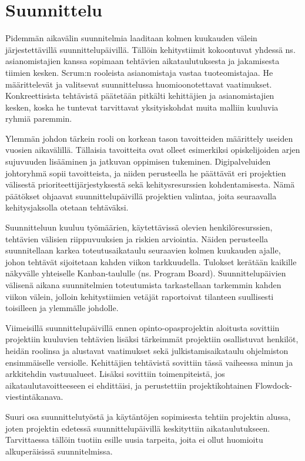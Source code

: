 \documentclass[11pt]{article}
\begin{document}
\section{Suunnittelu}

Pidemmän aikavälin suunnitelmia laaditaan kolmen kuukauden välein
järjestettävillä suun\-nit\-te\-lu\-päivillä. Tällöin kehitystiimit kokoontuvat
yhdessä ns. asianomistajien kanssa sopimaan tehtävien aikataulutuksesta ja
jakamisesta tiimien kesken. Scrum:n rooleista asi\-an\-omistaja vastaa
tuoteomistajaa. He määrittelevät ja valitsevat suunnittelussa huomioon\-otettavat
vaatimukset. Konkreettisista tehtävis\-tä päätetään pit\-käl\-ti
kehittäjien ja asian\-omistajien kes\-ken, koska he tuntevat tarvittavat
yksityis\-koh\-dat muita malliin kuuluvia ryhmiä paremmin.

Ylemmän johdon tärkein rooli on korkean tason tavoitteiden määrittely useiden
vuosien aikavälillä. Tällaisia tavoitteita ovat olleet esimerkiksi
opiskelijoiden arjen sujuvuuden lisää\-minen ja jatkuvan oppimisen tukeminen.
Digipalveluiden johtoryhmä sopii tavoitteista, ja niiden perusteella he
päättävät eri projektien välisestä prioriteetti\-jär\-jes\-tyksestä sekä
kehitysresurssien kohdentamisesta. Nämä päätökset ohjaavat suunnittelupäivillä
projektien valintaa, joita seuraavalla kehitysjaksolla otetaan
tehtäväksi.

Suunnitteluun kuuluu työmäärien, käytettävissä olevien henkilöresurssien,
tehtävien väli\-sien riippuvuuksien ja riskien arviointia. Näiden perusteella
suunnitellaan karkea toteutus\-aika\-taulu seuraavien kolmen kuukauden ajalle,
johon tehtävät sijoitetaan kahden viikon tarkkuudella.  Tulokset kerätään
kaikille näkyvälle yhtei\-selle Kanban-taululle (ns. Program Board).
Suunnittelupäivien välisenä aikana suunnitelmien toteutumista
tarkastellaan tar\-kemmin kahden viikon välein, jolloin kehitystii\-mien
vetä\-jät raportoivat tilanteen suullisesti toisilleen ja ylemmälle johdolle.

Viimeisillä suunnittelupäivillä ennen opinto-opasprojektin aloitusta sovittiin projektiin
kuuluvien tehtävien lisäk\-si tärkeimmät projektiin osallistuvat henkilöt,
heidän roolinsa ja alustavat vaatimukset sekä julkistamis\-aikataulu ohjelmiston
ensimmäiselle versiolle. Kehittäjien tehtävistä sovittiin tässä vaiheessa minun
ja arkkitehdin vastuualueet. Lisäksi sovittiin toimenpiteistä,
jos aikataulutavoitteeseen ei ehdittäisi, ja perustettiin projektikohtainen
Flowdock-viestintäkanava.

Suuri osa suunnittelutyöstä ja käytäntöjen sopimisesta tehtiin projektin alussa, joten
projektin edetessä suunnittelupäivillä keskityttiin aikataulutukseen.
Tarvittaessa tällöin tuotiin esille uusia tarpeita, joita ei ollut huomioitu
alkuperäisissä suun\-nitelmissa.
\end{document}
